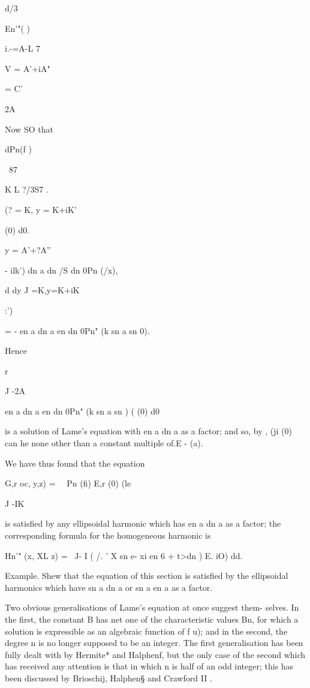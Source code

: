 {{{{{{{{d/3

En'"( )

i.-=A-L 7

V = A'+iA"

= C'

2A

Now SO that

dPn(f )

\ 87 \

K L ?/3S7 .

(? = K, y = K+iK'

(0) d0.

y = A'+?A''

- ilk') dn a dn /S dn 0Pn (/x),

d dy J =K,y=K+iK

:')

= - en a dn a en dn 0Pn" (k sn a sn 0).

Hence

r

J -2A

en a dn a en dn 0Pn" (k sn a sn ) ( (0) d0

is a solution of Lame's equation with en a dn a as a factor; and so,
by , (ji (0) can he none other than a constant multiple of.E -
(a).

%
%

We have thus found that the equation

G,r oc, y,z) = \ \ Pn (fi) E,r (0) (le

J -IK

is satisfied by any ellipsoidal harmonic which has en a dn a as a
factor; the corresponding formula for the homogeneous harmonic is

Hn'" (x, XL z) = \ J- I ( /. ' X sn e- xi en 6 + t>dn ) E. iO) dd.

Example. Shew that the equation of this section is satisfied by the
ellipsoidal harmonics which have sn a dn a or sn a en a as a factor.


Two obvious generalisations of Lame's equation at once suggest them-
selves. In the first, the constant B has net one of the characteristic
values Bn, for which a solution is expressible as an algebraic
function of f u); and in the second, the degree n is no longer
supposed to be an integer. The first generalisation has been fully
dealt with by Hermite* and Halphenf, but the only case of the second
which has received any attention is that in which n is half of an odd
integer; this has been discussed by Brioschij, Halphen§ and Crawford
II .

}}}}}}}}
